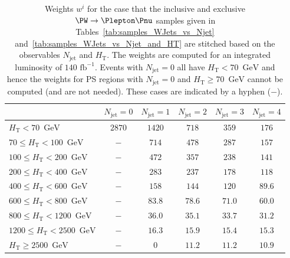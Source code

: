 \documentclass[twocolumn,epjc3]{svjour3}
\newcommand{\HT}{\ensuremath{H_{\mathrm{T}}}\xspace}
\newcommand{\GeV}{\ensuremath{\textrm{GeV}}\xspace}
\newcommand{\jet}{\ensuremath{\textrm{jet}}\xspace}
\newcommand{\fbinv}{\ensuremath{\textrm{~fb}^{-1}}\xspace}
\begin{document}
\begin{table}
\caption{
  Weights $w^{i}$ for the case that the inclusive and exclusive $\PW \to \Plepton\Pnu$ samples 
  given in 
  Tables~\ref{tab:samples_WJets_vs_Njet} and~\ref{tab:samples_WJets_vs_Njet_and_HT}
  are stitched based on the observables $N_{\jet}$ and $\HT$.
  The weights are computed for an integrated luminosity of $140\fbinv$.
  Events with $N_{\jet} = 0$ all have $\HT < 70$~\GeV and hence the weights for PS regions with $N_{\jet} = 0$ and $\HT \geqslant 70$~\GeV cannot be computed (and are not needed).
  These cases are indicated by a hyphen ($-$).
}
\label{tab:weights_WJets_vs_Njet_and_HT}
\begin{center}
\begin{tabular}{l|c|c|c|c|c}
\hline
                                 & $N_{\jet} = 0$ & $N_{\jet} = 1$      & $N_{\jet} = 2$      & $N_{\jet} = 3$      & $N_{\jet} = 4$       \\ 
\hline
               $\HT < 70$~\GeV   & $2870$         & $1420$              &  $718$              &  $359$              &  $176$  \\
  $70 \leqslant \HT < 100$~\GeV  & $-$            &  $714$              &  $478$              &  $287$              &  $157$  \\
 $100 \leqslant \HT < 200$~\GeV  & $-$            &  $472$              &  $357$              &  $238$              &  $141$  \\
 $200 \leqslant \HT < 400$~\GeV  & $-$            &  $283$              &  $237$              &  $178$              &  $118$  \\
 $400 \leqslant \HT < 600$~\GeV  & $-$            &  $158$              &  $144$              &  $120$              & $89.6$  \\
 $600 \leqslant \HT < 800$~\GeV  & $-$            & $83.8$              & $78.6$              & $71.0$              & $60.0$  \\
 $800 \leqslant \HT < 1200$~\GeV & $-$            & $36.0$              & $35.1$              & $33.7$              & $31.2$  \\
$1200 \leqslant \HT < 2500$~\GeV & $-$            & $16.3$              & $15.9$              & $15.4$              & $15.3$  \\
       $\HT \geqslant 2500$~\GeV & $-$            &    $0$              & $11.2$              & $11.2$              & $10.9$  \\
\hline
\end{tabular}
\end{center}
\end{table}
\end{document}
